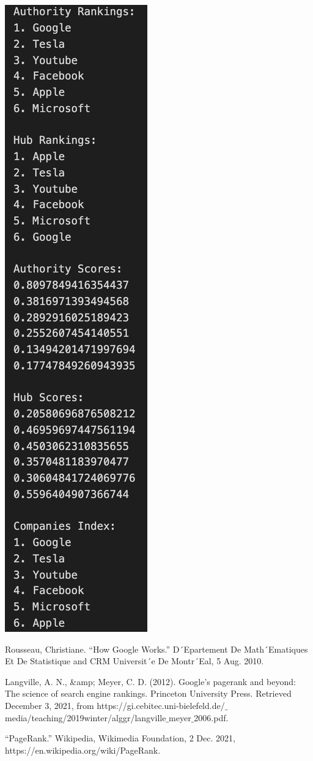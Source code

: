 \documentclass{article}
\begin{document}
\includegraphics[scale = 0.5]{results2.png}




\begin{thebibliography}{3}
Rousseau, Christiane. “How Google Works.” D´Epartement De Math´Ematiques Et De Statistique and CRM Universit´e De Montr´Eal, 5 Aug. 2010. 

Langville, A. N., &amp; Meyer, C. D. (2012). Google's pagerank and beyond: The science of search engine rankings. Princeton University Press. Retrieved December 3, 2021, from https://gi.cebitec.uni-bielefeld.de/$\_$media/teaching/2019winter/alggr/langville$\_$meyer$\_$2006.pdf. 
\raggedright
{}“PageRank.” Wikipedia, Wikimedia Foundation, 2 Dec. 2021, https://en.wikipedia.org/wiki/PageRank. 
\end{thebibliography}
\end{document}
